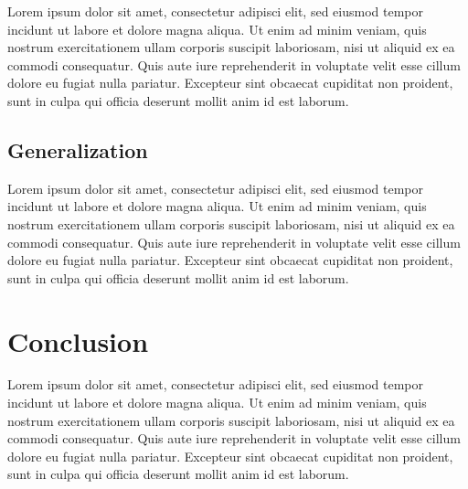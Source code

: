 \documentclass[11pt]{article} %
\begin{document}
\begin{multicols}{2}
  Lorem ipsum dolor sit amet, consectetur adipisci elit, sed eiusmod
  tempor incidunt ut labore et dolore magna aliqua. Ut enim ad minim
  veniam, quis nostrum exercitationem ullam corporis suscipit
  laboriosam, nisi ut aliquid ex ea commodi consequatur. Quis aute iure
  reprehenderit in voluptate velit esse cillum dolore eu fugiat nulla
  pariatur. Excepteur sint obcaecat cupiditat non proident, sunt in
  culpa qui officia deserunt mollit anim id est laborum.

  \subsection{Generalization}\label{generalization}

  Lorem ipsum dolor sit amet, consectetur adipisci elit, sed eiusmod
  tempor incidunt ut labore et dolore magna aliqua. Ut enim ad minim
  veniam, quis nostrum exercitationem ullam corporis suscipit
  laboriosam, nisi ut aliquid ex ea commodi consequatur. Quis aute iure
  reprehenderit in voluptate velit esse cillum dolore eu fugiat nulla
  pariatur. Excepteur sint obcaecat cupiditat non proident, sunt in
  culpa qui officia deserunt mollit anim id est laborum.

  \section{Conclusion}\label{conclusion}

  Lorem ipsum dolor sit amet, consectetur adipisci elit, sed eiusmod
  tempor incidunt ut labore et dolore magna aliqua. Ut enim ad minim
  veniam, quis nostrum exercitationem ullam corporis suscipit
  laboriosam, nisi ut aliquid ex ea commodi consequatur. Quis aute iure
  reprehenderit in voluptate velit esse cillum dolore eu fugiat nulla
  pariatur. Excepteur sint obcaecat cupiditat non proident, sunt in
  culpa qui officia deserunt mollit anim id est laborum.
\end{multicols}
\printbibliography %
\end{document}
